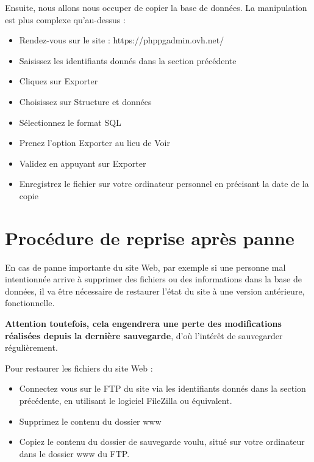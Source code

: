 \documentclass[11pt]{report}
\begin{document}
\par Ensuite, nous allons nous occuper de copier la base de données. La
manipulation est plus complexe qu'au-dessus : 
\begin{itemize}
  \item Rendez-vous sur le site : https://phppgadmin.ovh.net/
  \item Saisissez les identifiants donnés dans la section précédente
  \item Cliquez sur \og Exporter \fg{}
  \item Choisissez sur \og Structure et données \fg{}
  \item Sélectionnez le format \og SQL \fg{}
  \item Prenez l'option \og Exporter \fg{} au lieu de \og Voir \fg{}
  \item Validez en appuyant sur \og Exporter \fg{}
  \item Enregistrez le fichier sur votre ordinateur personnel en précisant la
  date de la copie
\end{itemize}

\section{Procédure de reprise après panne}
En cas de panne importante du site Web, par exemple si une personne mal
intentionnée arrive à supprimer des fichiers ou des informations dans la base de
données, il va être nécessaire de restaurer l'état du site à une version
antérieure, fonctionnelle. \\
\par \textbf{Attention toutefois, cela engendrera une perte
des modifications réalisées depuis la dernière sauvegarde}, d'où l'intérêt de
sauvegarder régulièrement. \\

\par Pour restaurer les fichiers du site Web : 
\begin{itemize}
  \item Connectez vous sur le FTP du site via les identifiants donnés dans la
  section précédente, en utilisant le logiciel FileZilla ou équivalent.
  \item Supprimez le contenu du dossier \og www \fg{}
  \item Copiez le contenu du dossier de sauvegarde voulu, situé sur votre
  ordinateur dans le dossier \og www \fg{} du FTP. \\
\end{itemize} 
\end{document}

